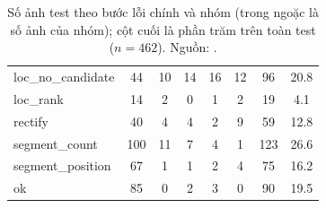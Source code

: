 \begin{table}[htbp]
\centering
\caption[Số ảnh test theo bước lỗi chính và nhóm]{Số ảnh test theo bước lỗi chính và nhóm (trong ngoặc là số ảnh của nhóm); cột cuối là phần trăm trên toàn test ($n=462$). Nguồn: .}
\label{tab:triage}
\footnotesize
\setlength{\tabcolsep}{3pt}
\begin{tabularx}{\textwidth}{lCCCCCCC}
\hline
{}  &  &  &  &  &  &  &  \\
\hline
loc\_no\_candidate & 44 & 10 & 14 & 16 & 12 & 96 & 20.8 \\
loc\_rank & 14 & 2 & 0 & 1 & 2 & 19 & 4.1 \\
rectify & 40 & 4 & 4 & 2 & 9 & 59 & 12.8 \\
segment\_count & 100 & 11 & 7 & 4 & 1 & 123 & 26.6 \\
segment\_position & 67 & 1 & 1 & 2 & 4 & 75 & 16.2 \\
ok & 85 & 0 & 2 & 3 & 0 & 90 & 19.5 \\
\hline
\end{tabularx}
\end{table}
